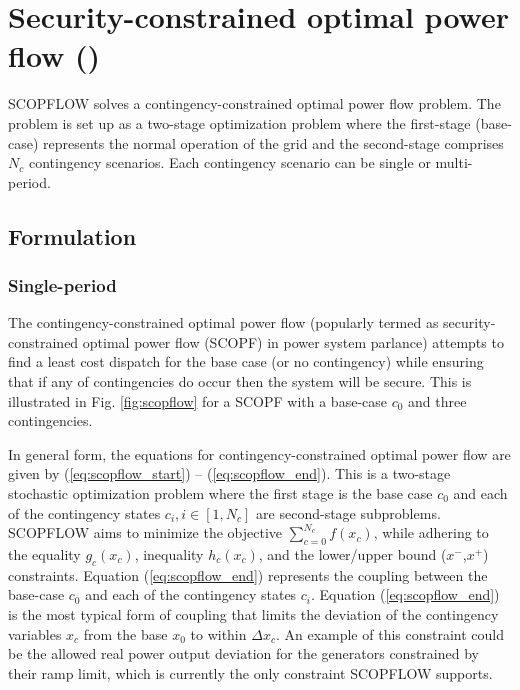\chapter{Security-constrained optimal power flow (\scopflow)}\label{chap:scopflow}
SCOPFLOW solves a contingency-constrained optimal power flow problem. The problem is set up as a two-stage optimization problem where the first-stage (base-case) represents the normal operation of the grid and the second-stage comprises $N_c$ contingency scenarios. Each contingency scenario can be single or multi-period.

\section{Formulation}

\subsection{Single-period}

The contingency-constrained optimal power flow (popularly termed as security-constrained optimal power flow (SCOPF) in power system parlance) attempts to find a least cost dispatch for the base case (or no contingency) while ensuring that if any of contingencies do occur then the system will be secure. This is illustrated in Fig. \ref{fig:scopflow} for a SCOPF with a base-case $c_0$ and three contingencies.



In general form, the equations for contingency-constrained optimal power flow are given by
(\ref{eq:scopflow_start}) -- (\ref{eq:scopflow_end}). This is a two-stage
stochastic optimization problem where the first stage is the base case $c_0$ and
each of the contingency states $c_i, i \in [1,N_c]$ are second-stage
subproblems. SCOPFLOW aims to minimize the objective $\sum_{c=0}^{N_c}f(x_c)$,
while adhering to the equality $g_c(x_c)$, inequality $h_c(x_c)$, and the
lower/upper bound ($x^-$,$x^+$) constraints. Equation (\ref{eq:scopflow_end})
represents the coupling between the base-case $c_0$ and each of the contingency states
$c_i$. Equation (\ref{eq:scopflow_end}) is the most typical form of coupling
that limits the deviation of the contingency variables $x_c$ from the base $x_0$
to within $\Delta x_c$. An example of this constraint could be the allowed real power output deviation for the generators constrained by their ramp limit, which is currently the only constraint SCOPFLOW supports.


